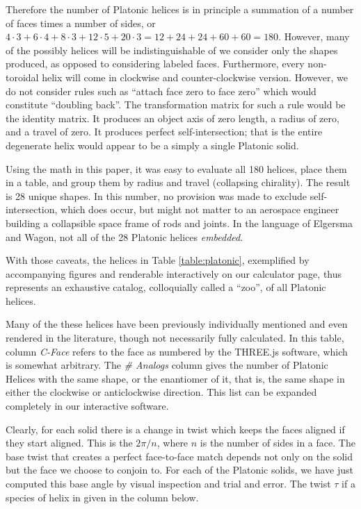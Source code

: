 \documentclass[11pt]{article}
\begin{document}
{Therefore the number of Platonic helices is in principle a summation of a number of faces times a number of sides, or
$4 \cdot 3 + 6 \cdot 4 + 8 \cdot 3 + 12 \cdot 5 + 20 \cdot 3 = 12 + 24 + 24 + 60 + 60 = 180$.
However, many of the possibly helices will be indistinguishable of we consider only the shapes produced, as
opposed to considering labeled faces. Furthermore,
every non-toroidal helix will come in clockwise and counter-clockwise version.
However, we do not consider rules such as ``attach face zero to face zero''
which would constitute
``doubling back''\cite{elgersma2016quadrahelix}.
The transformation matrix for such a rule would be the identity matrix.
It produces an object axis of zero length, a radius of zero, and
a travel of zero. It produces perfect self-intersection; that is the entire
degenerate helix would appear to be a simply a single Platonic solid.

Using the math in this paper, it was easy to evaluate all 180 helices,
place them in a table, and group them
by radius and travel (collapsing chirality).
The result is 28 unique shapes. In this number, no provision was made to exclude
self-intersection,
which does occur, but might not matter to
an aerospace engineer building a collapsible space frame of rods and joints.
In the language of Elgersma and Wagon\cite{elgersma2016quadrahelix}, not
all of the 28 Platonic helices {\em embedded}.

With those caveats, the helices in Table \ref{table:platonic}, exemplified by
accompanying figures and renderable
interactively on our calculator page, thus represents an exhaustive catalog,
colloquially called a ``zoo'', of all Platonic helices.

Many of the these helices have been previously individually
mentioned and even rendered in the literature,
though not necessarily fully calculated.
In this table, column {\em C-Face} refers to the
face as numbered by the THREE.js software\cite{dirksen2013learning},
which is somewhat arbitrary. The {\em \# Analogs}
column gives the number of Platonic Helices with the same shape, or the enantiomer of it, that is, the same
shape in either the clockwise or anticlockwise direction. This list can be expanded completely in our interactive software.

Clearly, for each solid there is a change in twist which keeps the faces
aligned if they start aligned. This is the $2\pi/n$,
where $n$ is the number of sides in a face. The base twist that creates
a perfect face-to-face match depends not only on the solid but the face we choose to conjoin to.
For each of the Platonic
solids, we have just computed this base angle by visual inspection and trial and error.
The twist $\tau$ if a species
of helix in given in the column below.

}
\end{document}
